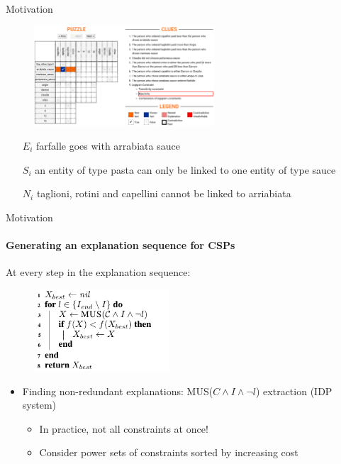 \documentclass{beamer}
\newcommand\m[1]{\ensuremath{#1}\xspace}
\newcommand\formulac{\ensuremath{\m{C} }\xspace}
\begin{document}
\begin{frame}{Motivation}
		\begin{figure}
		\includegraphics[width=0.6\textwidth]{logic_puzzles_bij.png}
	\end{figure}\pause
\begin{itemize}
	\item[$E_i$] farfalle goes with arrabiata sauce \pause
	\item[$S_i$] an entity of type pasta can only be linked to one entity of type sauce\pause
	\item[$N_i$] taglioni, rotini and capellini cannot be linked to arriabiata
\end{itemize}

\end{frame}

\newcommand\onestep{\ensuremath{\call{explain-One-Step}}\xspace}


\begin{frame}{Motivation}
	\framesubtitle{Generating an explanation sequence for CSPs}
	At every step in the explanation sequence:
	\begin{figure}
		\includegraphics[width=0.45\textwidth]{algo_mus2.png}
	\end{figure}
	 \begin{itemize}
		\item Finding non-redundant explanations: MUS($\formulac \land I \land \neg l$) extraction (IDP system)
		
		\begin{itemize}
			\item In practice, not all constraints at once! 
			\item Consider power sets of constraints sorted by increasing cost
		\end{itemize}
	\end{itemize}
\end{frame}
\end{document}
